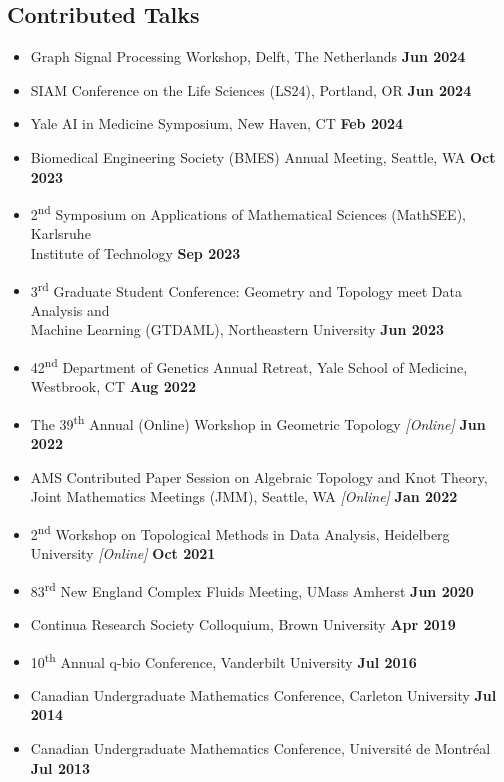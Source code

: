 \documentclass[margin,line]{res}
\begin{document}
\begin{resume}
\section{\sc Contributed Talks}
{\renewcommand\leftmargini{0em}
\begin{itemize}
\setlength\itemsep{0.3em}
\item[] Graph Signal Processing Workshop, Delft, The Netherlands \hfill {\bf \small Jun 2024}
\item[] SIAM Conference on the Life Sciences (LS24), Portland, OR \hfill {\bf \small Jun 2024}
\item[] Yale AI in Medicine Symposium, New Haven, CT \hfill {\bf \small Feb 2024}
\item[] Biomedical Engineering Society (BMES) Annual Meeting, Seattle, WA \hfill {\bf \small Oct 2023}
\item[] 2\textsuperscript{nd} Symposium on Applications of Mathematical Sciences (MathSEE), Karlsruhe \\ Institute of Technology \hfill {\bf \small Sep 2023}
\item[] 3\textsuperscript{rd} Graduate Student Conference: Geometry and Topology meet Data Analysis and \\Machine Learning (GTDAML), Northeastern University \hfill {\bf \small Jun 2023}
\item[] 42\textsuperscript{nd} Department of Genetics Annual Retreat, Yale School of Medicine, Westbrook, CT \hfill {\bf \small Aug 2022}
\item[] The 39\textsuperscript{th} Annual (Online) Workshop in Geometric Topology \textit{[Online]} \hfill {\bf \small Jun 2022}
\item[] AMS Contributed Paper Session on Algebraic Topology and Knot Theory, \\Joint Mathematics Meetings (JMM), Seattle, WA \textit{[Online]} \hfill {\bf \small Jan 2022}
\item[] 2\textsuperscript{nd} Workshop on Topological Methods in Data Analysis, Heidelberg University \textit{[Online]} \hfill {\bf \small Oct 2021}
\item[] 83\textsuperscript{rd} New England Complex Fluids Meeting, UMass Amherst \hfill {\bf \small Jun 2020}
\item[] Continua Research Society Colloquium, Brown University \hfill {\bf \small Apr 2019}
\item[] 10\textsuperscript{th} Annual q-bio Conference, Vanderbilt University \hfill {\bf \small Jul 2016}
\item[] Canadian Undergraduate Mathematics Conference, Carleton University \hfill {\bf \small Jul 2014}
\item[] Canadian Undergraduate Mathematics Conference, Universit\'e de Montr\'eal \hfill {\bf \small Jul 2013}
\end{itemize}
}


\end{resume}
\end{document}
